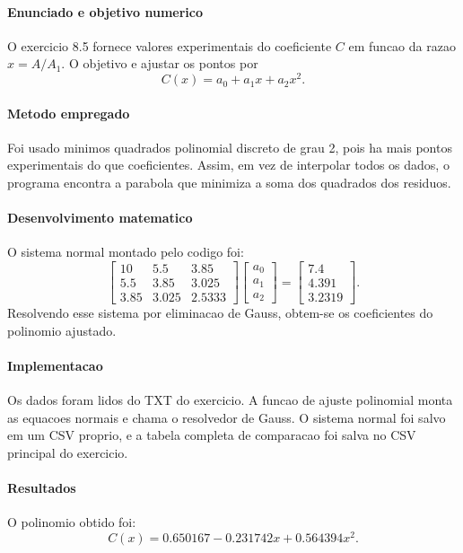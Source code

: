 \documentclass[../main.tex]{subfiles}
\begin{document}
\paragraph{Enunciado e objetivo numerico}
O exercicio 8.5 fornece valores experimentais do coeficiente \(C\) em funcao da
razao \(x=A/A_1\). O objetivo e ajustar os pontos por
\[
    C(x)=a_0+a_1x+a_2x^2.
\]

\paragraph{Metodo empregado}
Foi usado minimos quadrados polinomial discreto de grau 2, pois ha mais pontos
experimentais do que coeficientes. Assim, em vez de interpolar todos os dados, o
programa encontra a parabola que minimiza a soma dos quadrados dos residuos.

\paragraph{Desenvolvimento matematico}
O sistema normal montado pelo codigo foi:
\[
\begin{bmatrix}
10 & 5.5 & 3.85\\
5.5 & 3.85 & 3.025\\
3.85 & 3.025 & 2.5333
\end{bmatrix}
\begin{bmatrix}
a_0\\a_1\\a_2
\end{bmatrix}
=
\begin{bmatrix}
7.4\\4.391\\3.2319
\end{bmatrix}.
\]
Resolvendo esse sistema por eliminacao de Gauss, obtem-se os coeficientes do
polinomio ajustado.

\paragraph{Implementacao}
Os dados foram lidos do TXT do exercicio. A funcao de ajuste polinomial monta
as equacoes normais e chama o resolvedor de Gauss. O sistema normal foi salvo
em um CSV proprio, e a tabela completa de comparacao foi salva no CSV principal
do exercicio.

\paragraph{Resultados}
O polinomio obtido foi:
\[
    C(x)=0.650167 - 0.231742x + 0.564394x^2.
\]
\end{document}
